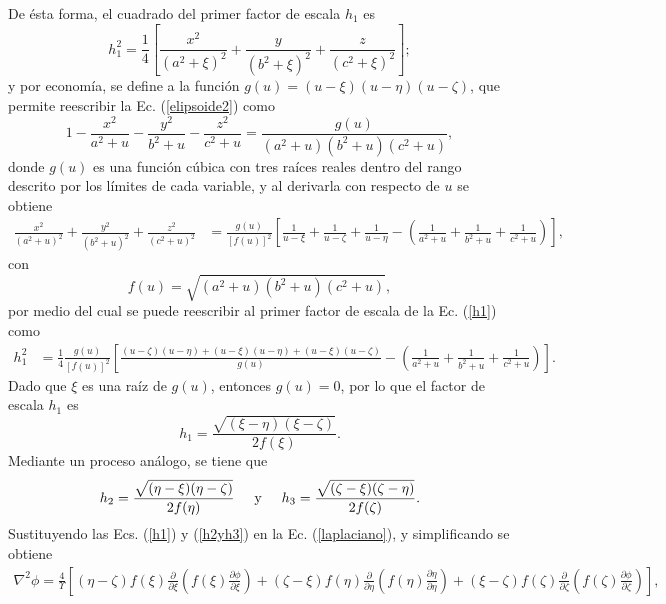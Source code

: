 De ésta forma, el cuadrado del primer factor de escala $h_1$ es
\begin{equation}
	h_1^2=\frac{1}{4}\left[\frac{x^2}{(a^2+\xi)^2}+\frac{y}{(b^2+\xi)^2}+\frac{z}{(c^2+\xi)^2}\right];
	\label{h1}
\end{equation}
y por economía, se define a la función $g(u)=(u-\xi)(u-\eta)(u-\zeta)$, que permite reescribir la Ec. (\ref{elipsoide2}) como
\begin{equation}
	1-\frac{x^2}{a^2+u}-\frac{y^2}{b^2+u}-\frac{z^2}{c^2+u}=\frac{g(u)}{(a^2+u)(b^2+u)(c^2+u)},
\end{equation}
donde $g(u)$ es una función cúbica con tres raíces reales dentro del rango descrito por los límites de cada variable, y al  derivarla con respecto de $u$ se obtiene
\begin{align}
	\frac{x^2}{(a^2+u)^2}+\frac{y^2}{(b^2+u)^2}+\frac{z^2}{(c^2+u)^2}&=\frac{g(u)}{[f(u)]^2}\left[\frac{1}{u-\xi}+\frac{1}{u-\zeta}+\frac{1}{u-\eta}-\left(\frac{1}{a^2+u}+\frac{1}{b^2+u}+\frac{1}{c^2+u}\right)\right],
\end{align}
con 
\begin{equation}
	f(u)=\sqrt{(a^2+u)(b^2+u)(c^2+u)},  
\end{equation}
por medio del cual se puede reescribir al primer factor de escala de la Ec. (\ref{h1}) como
\begin{align*}
	h_1^2&=\frac{1}{4}\frac{g(u)}{[f(u)]^2}\left[\frac{(u-\zeta)(u-\eta)+(u-\xi)(u-\eta)+(u-\xi)(u-\zeta)}{g(u)}-\left(\frac{1}{a^2+u}+\frac{1}{b^2+u}+\frac{1}{c^2+u}\right)\right].    
\end{align*}
Dado que $\xi$ es una raíz de $g(u)$, entonces $g(u)=0$, por lo que el factor de escala $h_1$ es
\begin{equation}
	h_1=\frac{\sqrt{(\xi-\eta)(\xi-\zeta)}}{2f(\xi)}.
	\label{h1_1}
\end{equation}
Mediante un proceso análogo, se tiene que \cite{Arfken}
\begin{equation}
	h_2=\frac{\sqrt{(\eta-\xi)(\eta-\zeta)}}{2f(\eta)}\hspace{0.5cm}\mbox{y}\hspace{0.5cm}
	h_3=\frac{\sqrt{(\zeta-\xi)(\zeta-\eta)}}{2f(\zeta)}.
	\label{h2yh3}
\end{equation}
Sustituyendo las Ecs. (\ref{h1}) y (\ref{h2yh3}) en la Ec. (\ref{laplaciano}), y simplificando se obtiene
\begin{align*}
	\nabla^2\phi=\frac{4}{\Upsilon}\left[(\eta-\zeta)f(\xi)\frac{\partial}{\partial\xi}\left(f(\xi)\frac{\partial\phi}{\partial\xi}\right)+(\zeta-\xi)f(\eta)\frac{\partial}{\partial\eta}\left(f(\eta)\frac{\partial\eta}{\partial\eta}\right)+(\xi-\zeta)f(\zeta)\frac{\partial}{\partial\zeta}\left(f(\zeta)\frac{\partial\phi}{\partial\zeta}\right)\right],
\end{align*}
